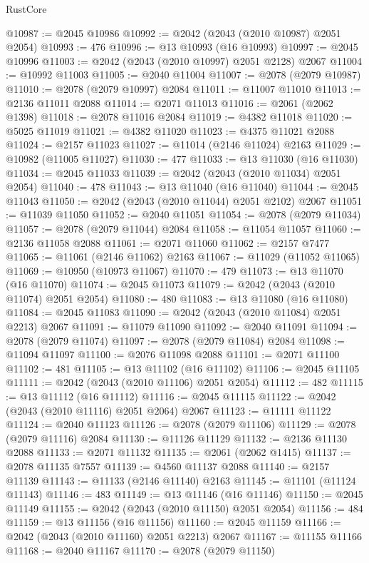 \begin{lexlean}{RustCore}
\begin{coremodule}
@10987 := @2045 @10986
@10992 := @2042 (@2043 (@2010 @10987) @2051 @2054)
@10993 := 476
@10996 := @13 @10993 (@16 @10993)
@10997 := @2045 @10996
@11003 := @2042 (@2043 (@2010 @10997) @2051 @2128) @2067
@11004 := @10992 @11003
@11005 := @2040 @11004
@11007 := @2078 (@2079 @10987)
@11010 := @2078 (@2079 @10997) @2084
@11011 := @11007 @11010
@11013 := @2136 @11011 @2088
@11014 := @2071 @11013
@11016 := @2061 (@2062 @1398)
@11018 := @2078 @11016 @2084
@11019 := @4382 @11018
@11020 := @5025 @11019
@11021 := @4382 @11020
@11023 := @4375 @11021 @2088
@11024 := @2157 @11023
@11027 := @11014 (@2146 @11024) @2163
@11029 := @10982 (@11005 @11027)
@11030 := 477
@11033 := @13 @11030 (@16 @11030)
@11034 := @2045 @11033
@11039 := @2042 (@2043 (@2010 @11034) @2051 @2054)
@11040 := 478
@11043 := @13 @11040 (@16 @11040)
@11044 := @2045 @11043
@11050 := @2042 (@2043 (@2010 @11044) @2051 @2102) @2067
@11051 := @11039 @11050
@11052 := @2040 @11051
@11054 := @2078 (@2079 @11034)
@11057 := @2078 (@2079 @11044) @2084
@11058 := @11054 @11057
@11060 := @2136 @11058 @2088
@11061 := @2071 @11060
@11062 := @2157 @7477
@11065 := @11061 (@2146 @11062) @2163
@11067 := @11029 (@11052 @11065)
@11069 := @10950 (@10973 @11067)
@11070 := 479
@11073 := @13 @11070 (@16 @11070)
@11074 := @2045 @11073
@11079 := @2042 (@2043 (@2010 @11074) @2051 @2054)
@11080 := 480
@11083 := @13 @11080 (@16 @11080)
@11084 := @2045 @11083
@11090 := @2042 (@2043 (@2010 @11084) @2051 @2213) @2067
@11091 := @11079 @11090
@11092 := @2040 @11091
@11094 := @2078 (@2079 @11074)
@11097 := @2078 (@2079 @11084) @2084
@11098 := @11094 @11097
@11100 := @2076 @11098 @2088
@11101 := @2071 @11100
@11102 := 481
@11105 := @13 @11102 (@16 @11102)
@11106 := @2045 @11105
@11111 := @2042 (@2043 (@2010 @11106) @2051 @2054)
@11112 := 482
@11115 := @13 @11112 (@16 @11112)
@11116 := @2045 @11115
@11122 := @2042 (@2043 (@2010 @11116) @2051 @2064) @2067
@11123 := @11111 @11122
@11124 := @2040 @11123
@11126 := @2078 (@2079 @11106)
@11129 := @2078 (@2079 @11116) @2084
@11130 := @11126 @11129
@11132 := @2136 @11130 @2088
@11133 := @2071 @11132
@11135 := @2061 (@2062 @1415)
@11137 := @2078 @11135 @7557
@11139 := @4560 @11137 @2088
@11140 := @2157 @11139
@11143 := @11133 (@2146 @11140) @2163
@11145 := @11101 (@11124 @11143)
@11146 := 483
@11149 := @13 @11146 (@16 @11146)
@11150 := @2045 @11149
@11155 := @2042 (@2043 (@2010 @11150) @2051 @2054)
@11156 := 484
@11159 := @13 @11156 (@16 @11156)
@11160 := @2045 @11159
@11166 := @2042 (@2043 (@2010 @11160) @2051 @2213) @2067
@11167 := @11155 @11166
@11168 := @2040 @11167
@11170 := @2078 (@2079 @11150)

\end{coremodule}
\end{lexlean}
